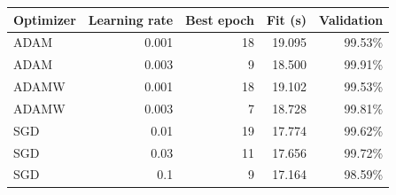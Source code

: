 \begin{center}\begin{tabular}{lrrrr}
\toprule
Optimizer & Learning rate & Best epoch & Fit (s) & Validation \\\midrule
ADAM & 0.001 & 18 & 19.095 & 99.53\% \\
ADAM & 0.003 & 9 & 18.500 & 99.91\% \\
ADAMW & 0.001 & 18 & 19.102 & 99.53\% \\
ADAMW & 0.003 & 7 & 18.728 & 99.81\% \\
SGD & 0.01 & 19 & 17.774 & 99.62\% \\
SGD & 0.03 & 11 & 17.656 & 99.72\% \\
SGD & 0.1 & 9 & 17.164 & 98.59\% \\
\bottomrule\end{tabular}\end{center}
